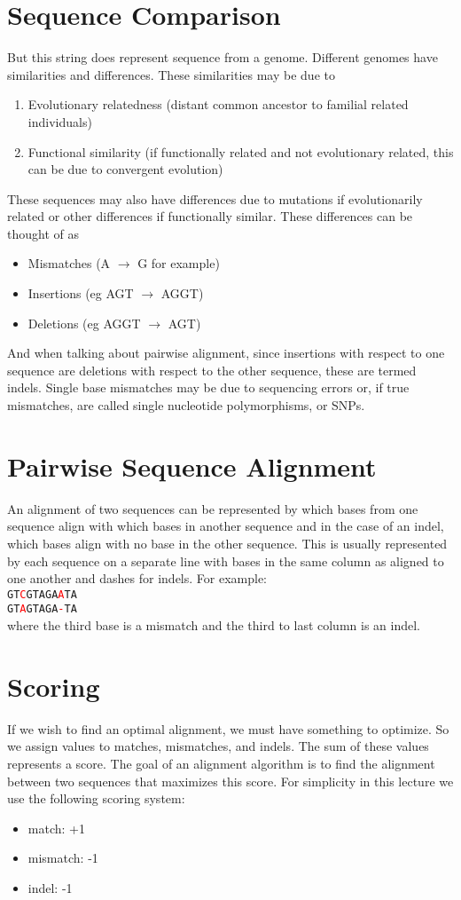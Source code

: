 \documentclass[11pt]{article}
\begin{document}
\section*{Sequence Comparison}
But this string does represent sequence from a genome. Different genomes have similarities and differences. These similarities may be due to
\begin{enumerate}
\item Evolutionary relatedness (distant common ancestor to familial related individuals)
\item Functional similarity (if functionally related and not evolutionary related, this can be due to convergent evolution)
\end{enumerate}
These sequences may also have differences due to mutations if evolutionarily related or other differences if functionally similar. These differences can be thought of as
\begin{itemize}
\item Mismatches (A $\rightarrow$ G for example)
\item Insertions (eg AGT $\rightarrow$ AGGT)
\item Deletions (eg AGGT $\rightarrow$ AGT)
\end{itemize}
And when talking about pairwise alignment, since insertions with respect to one sequence are deletions with respect to the other sequence, these are termed indels. Single base mismatches may be due to sequencing errors or, if true mismatches, are called single nucleotide polymorphisms, or SNPs.

\section*{Pairwise Sequence Alignment}
An alignment of two sequences can be represented by which bases from one sequence align with which bases in another sequence and in the case of an indel, which bases align with no base in the other sequence. This is usually represented by each sequence on a separate line with bases in the same column as aligned to one another and dashes for indels. For example: \\
\texttt{GT\textcolor{red}{C}GTAGA\textcolor{red}{A}TA} \\
\texttt{GT\textcolor{red}{A}GTAGA\textcolor{red}{-}TA} \\
where the third base is a mismatch and the third to last column is an indel.

\section*{Scoring}
If we wish to find an optimal alignment, we must have something to optimize. So we assign values to matches, mismatches, and indels. The sum of these values represents a score. The goal of an alignment algorithm is to find the alignment between two sequences that maximizes this score. For simplicity in this lecture we use the following scoring system:
\begin{itemize}
\item match: +1
\item mismatch: -1
\item indel: -1
\end{itemize}
\end{document}
